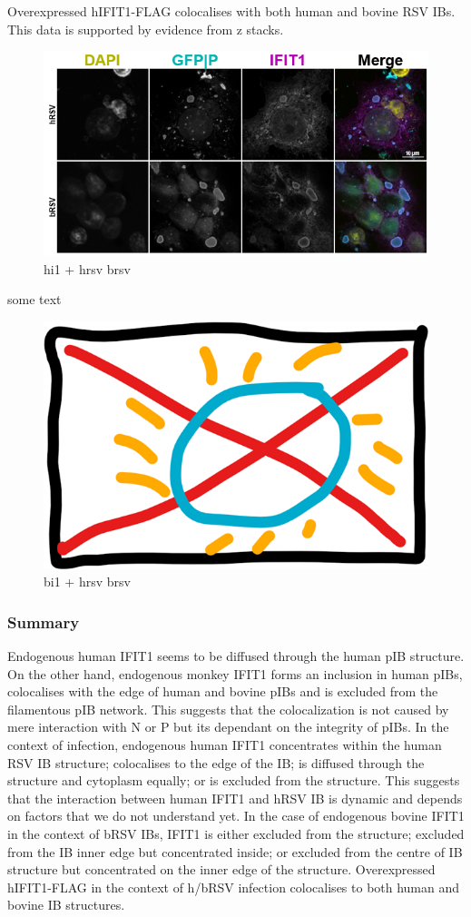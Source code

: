 Overexpressed hIFIT1-FLAG colocalises with both human and bovine RSV IBs. This data is supported by evidence from z stacks.

\begin{figure}
    \centering
    \includegraphics[width=1\linewidth]{08. Chapter 3/Figs/02. IFIT1/07. hi1 hrsv brsv.png}
    \caption[hi1 + hrsv brsv]{hi1 + hrsv brsv}
    \label{hi1 + hrsv brsv}
\end{figure}

some text

\begin{figure}
    \centering
    \includegraphics[width=0.5\linewidth]{06. Chapter 1//Figs/00. placeholder.png}
    \caption[bi1 + hrsv brsv]{bi1 + hrsv brsv}
    \label{bi1 + hrsv brsv}
\end{figure}

\subsubsection{Summary} \label{Summary}
Endogenous human IFIT1 seems to be diffused through the human pIB structure. On the other hand, endogenous monkey IFIT1 forms an inclusion in human pIBs, colocalises with the edge of human and bovine pIBs and is excluded from the filamentous pIB network. This suggests that the colocalization is not caused by mere interaction with N or P but its dependant on the integrity of pIBs. In the context of infection, endogenous human IFIT1 concentrates within the human RSV IB structure; colocalises to the edge of the IB; is diffused through the structure and cytoplasm equally; or is excluded from the structure. This suggests that the interaction between human IFIT1 and hRSV IB is dynamic and depends on factors that we do not understand yet. In the case of endogenous bovine IFIT1 in the context of bRSV IBs, IFIT1 is either excluded from the structure; excluded from the IB inner edge but concentrated inside; or excluded from the centre of IB structure but concentrated on the inner edge of the structure. Overexpressed hIFIT1-FLAG in the context of h/bRSV infection colocalises to both human and bovine IB structures.